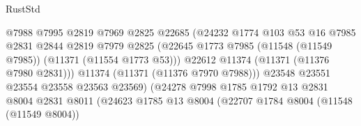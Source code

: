 \begin{lexlean}{RustStd}
\begin{coremodule}
                                            @7988
                                            @7995
                                            @2819
                                            @7969
                                            @2825
                                            @22685
                                            (@24232
                                              @1774
                                              @103
                                              @53
                                              @16
                                              @7985
                                              @2831
                                              @2844
                                              @2819
                                              @7979
                                              @2825
                                              (@22645
                                                @1773
                                                @7985
                                                (@11548 (@11549 @7985))
                                                (@11371 (@11554 @1773 @53)))
                                              @22612
                                              @11374
                                              (@11371 (@11376 @7980 @2831)))
                                            @11374
                                            (@11371 (@11376 @7970 @7988)))
                                          @23548
                                          @23551
                                          @23554
                                          @23558
                                          @23563
                                          @23569)
                                        (@24278
                                          @7998
                                          @1785
                                          @1792
                                          @13
                                          @2831
                                          @8004
                                          @2831
                                          @8011
                                          (@24623
                                            @1785
                                            @13
                                            @8004
                                            (@22707
                                              @1784
                                              @8004
                                              (@11548 (@11549 @8004))

\end{coremodule}
\end{lexlean}
